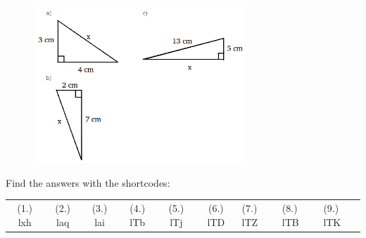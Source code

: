 \begin{enumerate}[noitemsep, label=\textbf{\arabic*}. ]
\begin{figure}[H]
\begin{center}
    \label{m39368*id401236!!!underscore!!!media}\label{m39368*id401236!!!underscore!!!printimage}\includegraphics[width=300px]{col11306.imgs/m39368_MG10C13_070.png} %
      \vspace{2pt}
    \vspace{.1in}
    \end{center}
 \end{figure}       
\end{enumerate}
      \label{m39368*uid132}
\par {} Find the answers with the shortcodes:
 \par \begin{tabular}[h]{cccccc}
 (1.) lxh  &  (2.) laq  &  (3.) lai  &  (4.) lTb  &  (5.) lTj  &  (6.) lTD  &  (7.) lTZ  &  (8.) lTB  &  (9.) lTK  & \end{tabular}
